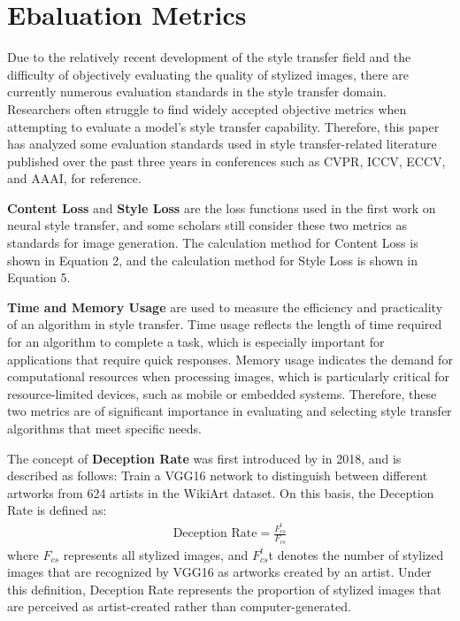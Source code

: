 \section{Ebaluation Metrics}

Due to the relatively recent development of the style transfer field\citep{02gatys2016image} and the difficulty of objectively evaluating the quality of stylized images, there are currently numerous evaluation standards in the style transfer domain. Researchers often struggle to find widely accepted objective metrics when attempting to evaluate a model's style transfer capability. Therefore, this paper has analyzed some evaluation standards used in style transfer-related literature published over the past three years in conferences such as CVPR, ICCV, ECCV, and AAAI, for reference.

\textbf{Content Loss} and \textbf{Style Loss} are the loss functions used in the first work on neural style transfer\citep{02gatys2016image}, and some scholars still consider these two metrics as standards for image generation. The calculation method for Content Loss is shown in Equation 2, and the calculation method for Style Loss is shown in Equation 5.

\textbf{Time and Memory Usage} are used to measure the efficiency and practicality of an algorithm in style transfer. Time usage reflects the length of time required for an algorithm to complete a task, which is especially important for applications that require quick responses. Memory usage indicates the demand for computational resources when processing images, which is particularly critical for resource-limited devices, such as mobile or embedded systems. Therefore, these two metrics are of significant importance in evaluating and selecting style transfer algorithms that meet specific needs.

The concept of \textbf{Deception Rate} was first introduced by\citep{73sanakoyeu2018style} in 2018, and is described as follows: Train a VGG16 network to distinguish between different artworks from 624 artists in the WikiArt dataset. On this basis, the Deception Rate is defined as:
\begin{equation}
    \begin{aligned}
        \text{Deception Rate} = \frac{F_{cs}^t}{F_{cs}}
    \end{aligned}
\end{equation}
where $F_{cs}$ represents all stylized images, and  $F_{cs}^t$t denotes the number of stylized images that are recognized by VGG16 as artworks created by an artist. Under this definition, Deception Rate represents the proportion of stylized images that are perceived as artist-created rather than computer-generated.

